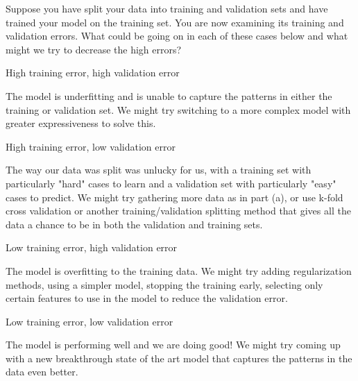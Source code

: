 Suppose you have split your data into training and validation sets and have
trained your model on the training set. You are now
examining its training and validation errors. What could be going on in each of these cases below and what
might we try to decrease the high errors?

\begin{Parts}
    \Part High training error, high validation error

    \begin{solution}
        The model is underfitting and is unable to capture the patterns in
        either the training or validation set. We might try switching to a more
        complex model with greater expressiveness to solve this.
    \end{solution}

    \Part High training error, low validation error

    \begin{solution}
        The way our data was split was unlucky for us, with a training set with
        particularly "hard" cases to learn and a validation set with
        particularly "easy" cases to predict. We might try gathering more data
        as in part (a), or use k-fold cross validation or another
        training/validation splitting method that gives all the data a chance
        to be in both the validation and training sets.
    \end{solution}

    \Part Low training error, high validation error

    \begin{solution}
        The model is overfitting to the training data. We might try adding
        regularization methods, using a simpler model, stopping the training
        early, selecting only certain features to use in the model to reduce
        the validation error.
    \end{solution}

    \Part Low training error, low validation error

    \begin{solution}
        The model is performing well and we are doing good! We might try coming
        up with a new breakthrough state of the art model that captures
        the patterns in the data even better.
    \end{solution}
\end{Parts}
